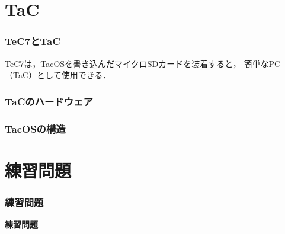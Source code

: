 \documentclass[unicode]{beamer}                   %
\begin{document}
\section{TaC}
\begin{frame}
  \frametitle{TeC7とTaC}
  \begin{minipage}{0.58\columnwidth}
  \end{minipage}
  \begin{minipage}{0.38\columnwidth}
  \end{minipage}
\vfill
TeC7は，TacOSを書き込んだマイクロSDカードを装着すると，
簡単なPC（TaC）として使用できる．
\end{frame}

\begin{frame}
  \frametitle{TaCのハードウェア}
\end{frame}

\begin{frame}
  \frametitle{TacOSの構造}
\end{frame}

\section{練習問題}
\begin{frame}
  \frametitle{練習問題}
  \vfill
  \begin{center}
    \textbf{\Huge 練習問題}
  \end{center}
  \vfill
\end{frame}
\end{document}

